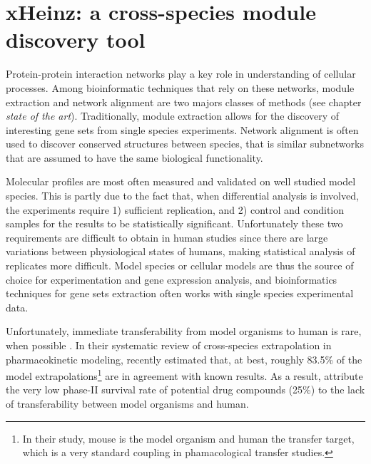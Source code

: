 \chapter[xHeinz: a cross-species module discovery tool][xHeinz]{xHeinz: a cross-species module discovery tool}
\label{chap:xheinz}

\label{sec:xhintro}
Protein-protein interaction networks play a key role in understanding of cellular processes.
Among bioinformatic techniques that rely on these networks, module extraction and network alignment are two majors classes of methods (see chapter \emph{state of the art}).
Traditionally, module extraction allows for the discovery of interesting gene sets from single species experiments.
Network alignment is often used to discover conserved structures between species, that is similar subnetworks that are assumed to have the same biological functionality.

Molecular profiles are most often measured and validated on well studied model species.
This is partly due to the fact that, when differential analysis is involved, the experiments require 1) sufficient replication, and 2) control and condition samples \parencite{trapnell2013differential} for the results to be statistically significant.
Unfortunately these two requirements are difficult to obtain in human studies since there are large variations between physiological states of humans, making statistical analysis of replicates more difficult.
Model species or cellular models are thus the source of choice for experimentation and gene expression analysis, and bioinformatics techniques for gene sets extraction often works with single species experimental data.

Unfortunately, immediate transferability from model organisms to human is rare, when possible \parencite{okyere2014cross}.
In their systematic review of cross-species extrapolation in pharmacokinetic modeling, \textcite{thiel2015systematic} recently estimated that, at best, roughly 83.5\% of the model extrapolations\footnote{In their study, mouse is the model organism and human the transfer target, which is a very standard coupling in phamacological transfer studies.} are in agreement with known results.
As a result, \Textcite{csermely2013structure} attribute the very low phase-II survival rate of potential drug compounds (25\%) to the lack of transferability between model organisms and human.

